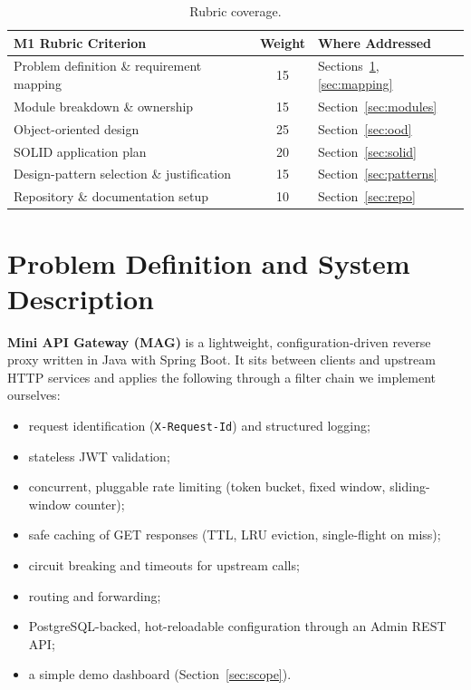 \documentclass[12pt,a4paper]{article}
\newcommand{\cls}[1]{\nolinkurl{#1}}
\begin{document}
\begin{table}[H]
\centering
\small
\begin{tabular}{L{6.2cm} c L{5cm}}
\toprule
\textbf{M1 Rubric Criterion} & \textbf{Weight} & \textbf{Where Addressed} \\
\midrule
Problem definition \& requirement mapping & 15 & Sections~\ref{sec:problem}, \ref{sec:mapping} \\
Module breakdown \& ownership & 15 & Section~\ref{sec:modules} \\
Object-oriented design & 25 & Section~\ref{sec:ood} \\
SOLID application plan & 20 & Section~\ref{sec:solid} \\
Design-pattern selection \& justification & 15 & Section~\ref{sec:patterns} \\
Repository \& documentation setup & 10 & Section~\ref{sec:repo} \\
\bottomrule
\end{tabular}
\caption{Rubric coverage.}
\end{table}

\section{Problem Definition and System Description}
\label{sec:problem}
\textbf{Mini API Gateway (MAG)} is a lightweight, configuration-driven reverse proxy written in Java with Spring Boot. It sits between clients and upstream HTTP services and applies the following through a filter chain we implement ourselves:

\begin{itemize}[noitemsep]
    \item request identification (\cls{X-Request-Id}) and structured logging;
    \item stateless JWT validation;
    \item concurrent, pluggable rate limiting (token bucket, fixed window, sliding-window counter);
    \item safe caching of GET responses (TTL, LRU eviction, single-flight on miss);
    \item circuit breaking and timeouts for upstream calls;
    \item routing and forwarding;
    \item PostgreSQL-backed, hot-reloadable configuration through an Admin REST API;
    \item a simple demo dashboard (Section~\ref{sec:scope}).
\end{itemize}
\end{document}
